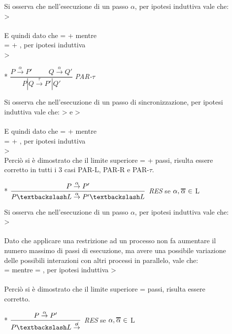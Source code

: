 \begin{itemize}
\begin{itemize}
			Si osserva che nell'esecuzione di un passo $\alpha$, per ipotesi induttiva vale che:  >  \\
			\\
			E quindi dato che  =  +  mentre\\  =  + , per ipotesi induttiva \\  > 
			\\
		\item[*]
			$\dfrac{P \overset{\alpha}\rightarrow P' \hspace{1cm} Q \overset{\alpha}\rightarrow Q'}{P|Q \overset{\tau}\rightarrow P'|Q'}$ \textit{PAR-$\tau$}  
			
			Si osserva che nell'esecuzione di un passo di sincronizzazione, per ipotesi induttiva vale che:  >  e  >  \\
			\\
			E quindi dato che  =  +  mentre\\  =  + , per ipotesi induttiva \\  > 
			\\
			
		Perciò si è dimostrato che il limite superiore   = +  passi, risulta essere corretto in tutti i 3 casi PAR-L, PAR-R e PAR-$\tau$.
		\\
		\item[*]
			$\dfrac{P \overset{\alpha}\rightarrow P'}{P \textbackslash L \overset{\alpha}\rightarrow P' \textbackslash L}$ \textit{RES} se $\alpha, \Overline[1pt]{\alpha} \in$ L
			
			Si osserva che nell'esecuzione di un passo $\alpha$, per ipotesi induttiva vale che:  >   \\
			\\
			Dato che applicare una restrizione ad un processo non fa aumentare il numero massimo di passi di esecuzione, ma avere una possibile variazione delle possibili interazioni con altri processi in parallelo, vale che:\\  =  mentre  = , per ipotesi induttiva  > \\
			\\
		Perciò si è dimostrato che il limite superiore  =  passi, risulta essere corretto.
		\\
		\item[*]
			$\dfrac{P \overset{\alpha}\rightarrow P'}{P \textbackslash L \overset{\not\alpha}\rightarrow }$ \textit{RES} se $\alpha, \Overline[1pt]{\alpha} \in$ L
			

\end{itemize}
\end{itemize}
